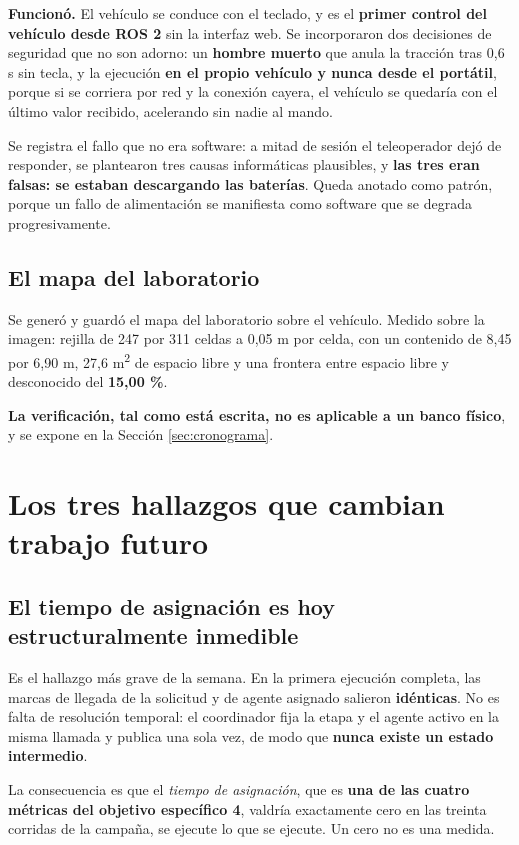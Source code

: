 \documentclass[12pt,letterpaper]{article}
\begin{document}
\textbf{Funcionó.} El vehículo se conduce con el teclado, y es el \textbf{primer control del vehículo desde ROS 2} sin la interfaz web. Se incorporaron dos decisiones de seguridad que no son adorno: un \textbf{hombre muerto} que anula la tracción tras 0,6 s sin tecla, y la ejecución \textbf{en el propio vehículo y nunca desde el portátil}, porque si se corriera por red y la conexión cayera, el vehículo se quedaría con el último valor recibido, acelerando sin nadie al mando.

Se registra el fallo que no era software: a mitad de sesión el teleoperador dejó de responder, se plantearon tres causas informáticas plausibles, y \textbf{las tres eran falsas: se estaban descargando las baterías}. Queda anotado como patrón, porque un fallo de alimentación se manifiesta como software que se degrada progresivamente.

\subsection{El mapa del laboratorio}

Se generó y guardó el mapa del laboratorio sobre el vehículo. Medido sobre la imagen: rejilla de 247 por 311 celdas a 0,05 m por celda, con un contenido de 8,45 por 6,90 m, 27,6 m\textsuperscript{2} de espacio libre y una frontera entre espacio libre y desconocido del \textbf{15,00 \%}.

\textbf{La verificación, tal como está escrita, no es aplicable a un banco físico}, y se expone en la Sección \ref{sec:cronograma}.

\section{Los tres hallazgos que cambian trabajo futuro}
\label{sec:hallazgos}

\subsection{El tiempo de asignación es hoy estructuralmente inmedible}

Es el hallazgo más grave de la semana. En la primera ejecución completa, las marcas de llegada de la solicitud y de agente asignado salieron \textbf{idénticas}. No es falta de resolución temporal: el coordinador fija la etapa y el agente activo en la misma llamada y publica una sola vez, de modo que \textbf{nunca existe un estado intermedio}.

La consecuencia es que el \emph{tiempo de asignación}, que es \textbf{una de las cuatro métricas del objetivo específico 4}, valdría exactamente cero en las treinta corridas de la campaña, se ejecute lo que se ejecute. Un cero no es una medida.
\end{document}
